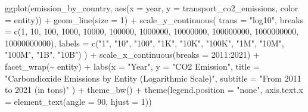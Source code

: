 \documentclass[
  11pt,
  a4paper,
  DIV=11,
  numbers=noendperiod]{scrartcl}
\newenvironment{Shaded}{\begin{snugshade}}{\end{snugshade}}
\newcommand{\AttributeTok}[1]{\textcolor[rgb]{0.40,0.45,0.13}{#1}}
\newcommand{\DecValTok}[1]{\textcolor[rgb]{0.68,0.00,0.00}{#1}}
\newcommand{\FunctionTok}[1]{\textcolor[rgb]{0.28,0.35,0.67}{#1}}
\newcommand{\NormalTok}[1]{\textcolor[rgb]{0.00,0.23,0.31}{#1}}
\newcommand{\SpecialCharTok}[1]{\textcolor[rgb]{0.37,0.37,0.37}{#1}}
\newcommand{\StringTok}[1]{\textcolor[rgb]{0.13,0.47,0.30}{#1}}
\begin{document}
\begin{Shaded}
\begin{Highlighting}[]
\FunctionTok{ggplot}\NormalTok{(emission\_by\_country, }\FunctionTok{aes}\NormalTok{(}\AttributeTok{x =}\NormalTok{ year, }\AttributeTok{y =}\NormalTok{ transport\_co2\_emissions, }\AttributeTok{color =}\NormalTok{ entity)) }\SpecialCharTok{+}
  \FunctionTok{geom\_line}\NormalTok{(}\AttributeTok{size =} \DecValTok{1}\NormalTok{) }\SpecialCharTok{+}
  \FunctionTok{scale\_y\_continuous}\NormalTok{(}
    \AttributeTok{trans =} \StringTok{"log10"}\NormalTok{,}
    \AttributeTok{breaks =} \FunctionTok{c}\NormalTok{(}\DecValTok{1}\NormalTok{, }\DecValTok{10}\NormalTok{, }\DecValTok{100}\NormalTok{, }\DecValTok{1000}\NormalTok{, }\DecValTok{10000}\NormalTok{, }\DecValTok{100000}\NormalTok{, }\DecValTok{1000000}\NormalTok{, }\DecValTok{10000000}\NormalTok{, }\DecValTok{100000000}\NormalTok{, }\DecValTok{1000000000}\NormalTok{, }\DecValTok{10000000000}\NormalTok{),}
    \AttributeTok{labels =} \FunctionTok{c}\NormalTok{(}\StringTok{"1"}\NormalTok{, }\StringTok{"10"}\NormalTok{, }\StringTok{"100"}\NormalTok{, }\StringTok{"1K"}\NormalTok{, }\StringTok{"10K"}\NormalTok{, }\StringTok{"100K"}\NormalTok{, }\StringTok{"1M"}\NormalTok{, }\StringTok{"10M"}\NormalTok{, }\StringTok{"100M"}\NormalTok{, }\StringTok{"1B"}\NormalTok{, }\StringTok{"10B"}\NormalTok{)}
\NormalTok{  ) }\SpecialCharTok{+}
  \FunctionTok{scale\_x\_continuous}\NormalTok{(}\AttributeTok{breaks =} \DecValTok{2011}\SpecialCharTok{:}\DecValTok{2021}\NormalTok{) }\SpecialCharTok{+}
  \FunctionTok{facet\_wrap}\NormalTok{(}\SpecialCharTok{\textasciitilde{}}\NormalTok{ entity) }\SpecialCharTok{+}
  \FunctionTok{labs}\NormalTok{(}\AttributeTok{x =} \StringTok{"Year"}\NormalTok{, }
       \AttributeTok{y =} \StringTok{"CO2 Emission"}\NormalTok{,}
       \AttributeTok{title =} \StringTok{"Carbondioxide Emissions by Entity (Logarithmic Scale)"}\NormalTok{,}
       \AttributeTok{subtitle =} \StringTok{"From 2011 to 2021 (in tons)"}
\NormalTok{       ) }\SpecialCharTok{+}
  \FunctionTok{theme\_bw}\NormalTok{() }\SpecialCharTok{+}
  \FunctionTok{theme}\NormalTok{(}\AttributeTok{legend.position =} \StringTok{"none"}\NormalTok{,}
        \AttributeTok{axis.text.x =} \FunctionTok{element\_text}\NormalTok{(}\AttributeTok{angle =} \DecValTok{90}\NormalTok{, }\AttributeTok{hjust =} \DecValTok{1}\NormalTok{))}
\end{Highlighting}
\end{Shaded}
\end{document}
